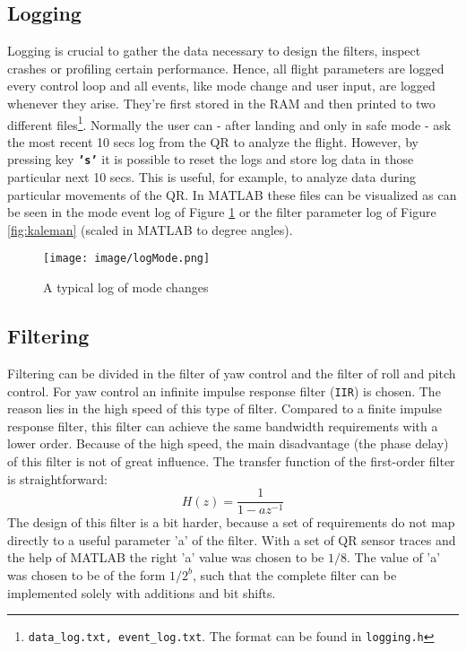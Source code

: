 \documentclass[a4paper]{article}
\begin{document}
\subsection{Logging} 
 Logging is crucial to gather the data necessary to design the filters, inspect crashes or profiling certain performance. Hence, all flight parameters are logged every control loop and all events, like mode change and user input, are logged whenever they arise. They're first stored in the RAM and then printed to two different files\footnote{\texttt{data\_log.txt, event\_log.txt}. The format can be found in \texttt{logging.h}}.
Normally the user can - after landing and only in safe mode - ask the most recent 10 secs log from the QR to analyze the flight. However, by pressing key \textbf{\texttt{'s'}} it is possible to reset the logs and store log data in those particular next 10 secs. This is useful, for example, to analyze data during particular movements of the QR. In MATLAB these files can be visualized as can be seen in the mode event log of Figure \ref{fig:logmode} or the filter parameter log of Figure \ref{fig:kaleman} (scaled in MATLAB to degree angles).
\begin{figure}[h!]
  \centering
  \texttt{[image: image/logMode.png]}
  \caption{A typical log of mode changes}
  \label{fig:logmode}
\end{figure}

\subsection{Filtering} %
Filtering can be divided in the filter of yaw control and the filter of roll and pitch control. For yaw control an infinite impulse response filter (\texttt{IIR}) is chosen. The reason lies in the high speed of this type of filter. Compared to a finite impulse response filter, this filter can achieve the same bandwidth requirements with a lower order. Because of the high speed, the main disadvantage (the phase delay) of this filter is not of great influence. The transfer function of the first-order filter is straightforward: 
\[H(z) = \frac{1}{1 - a z^{-1}}\]
The design of this filter is a bit harder, because a set of requirements do not map directly to a useful parameter 'a' of the filter. With a set of QR sensor traces and the help of MATLAB the right 'a' value was chosen to be $1/8$. The value of 'a' was chosen to be of the form $1/2^b$, such that the complete filter can be implemented solely with additions and bit shifts.
\end{document}
